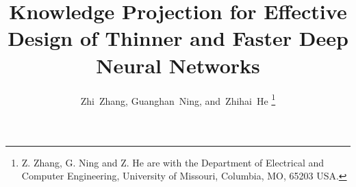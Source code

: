 \documentclass[journal]{IEEEtran}
\begin{document}
%
\title{Knowledge Projection for Effective Design of Thinner and Faster Deep Neural Networks}
%
%
%

\author{Zhi~Zhang,
        Guanghan~Ning,
        and~Zhihai~He%
\thanks{Z. Zhang, G. Ning and Z. He are with the Department
of Electrical and Computer Engineering, University of Missouri, Columbia,
MO, 65203 USA.}}%

% 
%



% 
\end{document}
